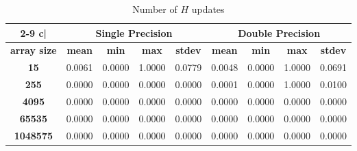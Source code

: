 \documentclass[preprint,1p,times]{elsarticle}
\begin{document}
\begin{table}[h]
	\begin{tabular}{| c | c c c c | c c c c |}
		\cline{2-9}
		\multicolumn{1} {c|}{}  & \multicolumn{4}{c|}{\textbf{Single Precision}}  & \multicolumn{4}{c|}{\textbf{Double Precision}} \\
		\hline
		\textbf{array size} & \textbf{mean} & \textbf{min} & \textbf{max} & \textbf{stdev} & \textbf{mean} & \textbf{min} & \textbf{max} & \textbf{stdev} \\
		\hline
		\multicolumn{1}{|c|}{\textbf{15}                                    } &     0.0061 &     0.0000 &     1.0000 &     0.0779 &     0.0048 &     0.0000 &     1.0000 &     0.0691 \\
		\multicolumn{1}{|c|}{\textbf{255}                                   } &     0.0000 &     0.0000 &     0.0000 &     0.0000 &     0.0001 &     0.0000 &     1.0000 &     0.0100 \\
		\multicolumn{1}{|c|}{\textbf{4095}                                  } &     0.0000 &     0.0000 &     0.0000 &     0.0000 &     0.0000 &     0.0000 &     0.0000 &     0.0000 \\
		\multicolumn{1}{|c|}{\textbf{65535}                                 } &     0.0000 &     0.0000 &     0.0000 &     0.0000 &     0.0000 &     0.0000 &     0.0000 &     0.0000 \\
		\multicolumn{1}{|c|}{\textbf{1048575}                               } &     0.0000 &     0.0000 &     0.0000 &     0.0000 &     0.0000 &     0.0000 &     0.0000 &     0.0000 \\
		\hline
	\end{tabular}
	\caption{Number of $H$ updates}
	\label{tab:results101}
\end{table}
\end{document}
